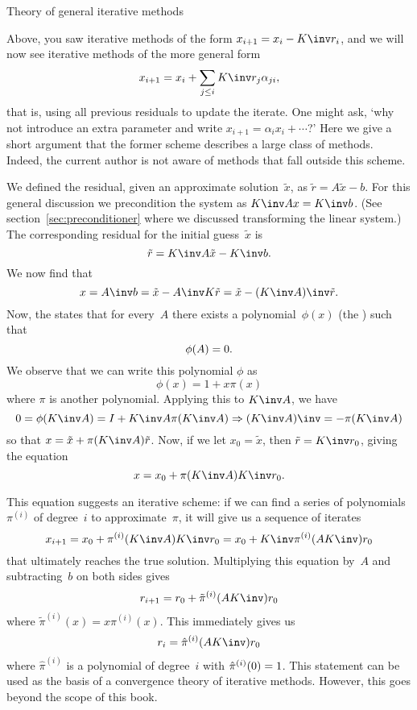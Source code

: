  {Theory of general iterative methods}
\label{sec:nonstationary}

Above, you saw iterative methods of the form $x_{i+1}=x_i-K\inv r_i$,
and we will now see iterative methods of the more general form
\begin{equation}
  x_{i+1}=x_i+\sum_{j\leq i}K\inv r_j\alpha_{ji},
  \label{eq:it-general-x}
\end{equation}
that is, using all previous residuals to update the iterate.
One might ask, `why not introduce an extra
parameter and write $x_{i+1}=\alpha_i x_i+\cdots$?' Here we give a
short argument that the former scheme describes a large class of
methods. Indeed, the current author is not aware of methods that fall
outside this scheme.

We defined the residual, given an approximate solution~$\tilde x$, as
$ \tilde r=A\tilde x-b $. For this general discussion we precondition the system
as $K\inv Ax=K\inv b$. (See section~\ref{sec:preconditioner} where we
discussed transforming the linear system.)
The corresponding residual for the initial
guess~$\tilde x$ is
\[ \tilde r = K\inv A\tilde x-K\inv b. \]
We now find that 
\[ x=A\inv b=\tilde x-A\inv K\tilde r = \tilde x-(K\inv A)\inv \tilde r. \]
%
Now, the  states that for
every~$ A $ there exists a polynomial~$\phi(x)$ (the
) such that
\[ \phi(A)=\nobreak0 .\]
We observe that we can write this polynomial $\phi$ as
\[ \phi(x)=1+x\pi(x) \]
where $\pi$ is another polynomial.
%
Applying this to $K\inv A$, we have
\[
  0 = \phi( K\inv A ) = I + K\inv A \pi( K\inv A ) 
  \Rightarrow
  (K\inv A)\inv=-\pi(K\inv A)
\]
so that $ x = \tilde x + \pi(K\inv A)\tilde r $. Now, if we let
$x_0=\tilde x$, then $\tilde r = K\inv r_0$, giving the equation
\[ x = x_0 + \pi(K\inv A)K\inv r_0. \]

This equation suggests an iterative scheme: if we can find a
series of polynomials~$\pi^{(i)}$ of degree~$i$
to approximate~$\pi$, it will give
us a sequence of iterates 
\begin{equation}
  x_{i+1} = x_0+\pi^{(i)}(K\inv A)K\inv r_0
  = x_0+K\inv \pi^{(i)}(AK\inv) r_0
  \label{eq:x-from-PA-r0}
\end{equation}
that ultimately reaches the true solution.
Multiplying this equation by~$A$ and subtracting~$b$ on both sides gives
\[ r_{i+1} = r_0+\tilde\pi^{(i)}(AK\inv)r_0 \]
where $\tilde\pi^{(i)}(x)=x\pi^{(i)}(x)$. This immediately gives us
\begin{equation}
  r_i = \hat\pi^{(i)}(AK\inv) r_0
  \label{eq:r-is-polynomial}
\end{equation}
where $\hat\pi^{(i)}$ is a polynomial of degree~$i$ with
$\hat\pi^{(i)}(0)=\nobreak1$. This statement can be used as the basis
of a convergence theory of iterative methods. However, this goes
beyond the scope of this book.

